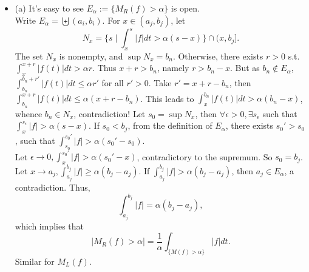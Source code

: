 \begin{itemize}
\item[2.1.11]

(a) It's easy to see $E_\alpha:=\{M_R(f)>\alpha\}$ is open.\\
Write $E_\alpha=\biguplus (a_i,b_i)$. For $x\in (a_j,b_j)$, let 
$$N_x=\{s\mid\int_x^s\vert f\vert dt>\alpha(s-x)\}\cap(x,b_j].$$
The set $N_x$ is nonempty, and $\sup N_{x} = b_{n}$. 
Otherwise, there exists $r>0$ s.t. 
$\displaystyle{\int_{x}^{x+r}|f(t)|dt > \alpha r}$.
Thus $x+r > b_{n}$, namely $r > b_{n} - x$. But as $b_{n} \notin E_{\alpha}$, 
$\displaystyle{\int_{b_{n}}^{b_{n} + r'}|f(t)|dt \leq \alpha r'}$ 
for all $r' > 0$. Take $r' = x+r -b_{n}$, then
$\displaystyle{\int_{b_{n}}^{x+r}|f(t)|dt \leq \alpha(x + r - b_{n})}$.
This leads to $\displaystyle{\int_{x}^{b_{n}}|f(t)|dt > \alpha(b_{n} - x)}$, 
whence $b_{n} \in N_{x}$, contradiction! 
Let $s_0 =\sup N_x$, then $\forall \epsilon >0,\exists s_\epsilon $ 
such that $\displaystyle{\int_x^{s_\epsilon}\vert f\vert>\alpha(s-x)}$. 
If $s_0<b_j$, from the definition of $E_\alpha$, there exists $s_0'>s_0$, 
such that $\displaystyle{\int_{s_0}^{s_0'}\vert f\vert>\alpha(s_0'-s_0)}$.\\
Let $\displaystyle{\epsilon\rightarrow 0, \int_x^{s_0'}\vert f\vert>\alpha(s_0'-x)}$, 
contradictory to the supremum. So $s_0=b_j$.\\
Let $x\rightarrow a_j,\displaystyle{\int_{a_j}^{b_j}\vert f\vert\geq\alpha(b_j-a_j)}$. 
If $\displaystyle{\int_{a_j}^{b_j}\vert f\vert>\alpha(b_j-a_j)}$, 
then $a_j\in E_\alpha$, a contradiction. 
Thus, $$\int_{a_j}^{b_j}\vert f\vert=\alpha(b_j-a_j),$$
which implies that 
$$\vert M_R(f)>\alpha \vert=\frac1\alpha \int_{\{M(f)>\alpha\}}\vert f\vert dt.$$
Similar for $M_L(f)$.


\end{itemize}
